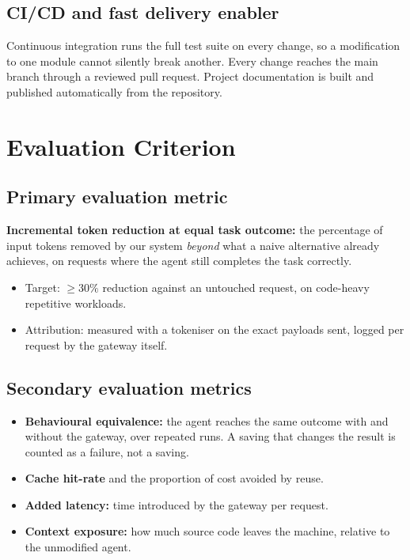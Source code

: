 \documentclass[11pt,a4paper]{article}
\begin{document}
\subsection{CI/CD and fast delivery enabler}
Continuous integration runs the full test suite on every change, so a
modification to one module cannot silently break another. Every change reaches
the main branch through a reviewed pull request. Project documentation is built
and published automatically from the repository.

\section{Evaluation Criterion}

\subsection{Primary evaluation metric}
\textbf{Incremental token reduction at equal task outcome:} the percentage of
input tokens removed by our system \emph{beyond} what a naive alternative
already achieves, on requests where the agent still completes the task
correctly.

\begin{itemize}[noitemsep]
  \item Target: $\geq 30\%$ reduction against an untouched request, on
        code-heavy repetitive workloads.
  \item Attribution: measured with a tokeniser on the exact payloads sent, logged
        per request by the gateway itself.
\end{itemize}

\subsection{Secondary evaluation metrics}
\begin{itemize}[noitemsep]
  \item \textbf{Behavioural equivalence:} the agent reaches the same outcome with
        and without the gateway, over repeated runs. A saving that changes the
        result is counted as a failure, not a saving.
  \item \textbf{Cache hit-rate} and the proportion of cost avoided by reuse.
  \item \textbf{Added latency:} time introduced by the gateway per request.
  \item \textbf{Context exposure:} how much source code leaves the machine,
        relative to the unmodified agent.
\end{itemize}
\end{document}
